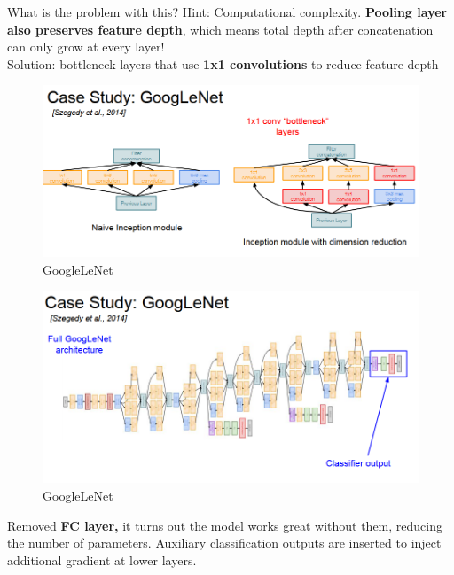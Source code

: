 \documentclass[11pt]{article}
\begin{document}
What is the problem with this? Hint: Computational complexity. \textbf{Pooling layer also preserves feature depth}, which means total depth after concatenation can only grow at every layer!\\
Solution: bottleneck layers that use \textbf{1x1 convolutions} to reduce feature depth
\begin{figure}[h]
\centering
\captionsetup{justification=centering}
\includegraphics[width=0.9\linewidth]{L813.pdf}
\caption{ GoogleLeNet}
\label{fig:L813}
\end{figure}
\clearpage
\begin{figure}[h]
\centering
\captionsetup{justification=centering}
\includegraphics[width=0.9\linewidth]{L814.pdf}
\caption{ GoogleLeNet}
\label{fig:L814}


\end{figure}
Removed \textbf{FC layer,} it turns out the model works great without them, reducing the number of parameters. Auxiliary classification outputs are inserted to inject additional gradient at lower layers. 
\end{document}
